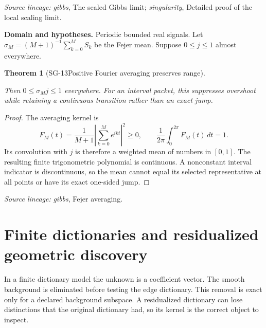 \documentclass[11pt]{article}
\newtheorem{theorem}{Theorem}[section]
\theoremstyle{definition}\newtheorem{definition}[theorem]{Definition}
\theoremstyle{remark}\newtheorem{remark}[theorem]{Remark}
\begin{document}
\par{\small\color{Teal}\textit{Source lineage:} \textit{gibbs}, The scaled Gibbs limit; \textit{singularity}, Detailed proof of the local scaling limit.}\par

\par{\small\textbf{Domain and hypotheses.} Periodic bounded real signals. Let $\sigma_M=(M+1)^{-1}\sum_{k=0}^MS_k$ be the Fejer mean. Suppose $0\le j\le1$ almost everywhere.}\par
\begin{theorem}[SG-13\quad Positive Fourier averaging preserves range]\label{SG-13}

Then $0\le\sigma_Mj\le1$ everywhere. For an interval packet, this suppresses
overshoot while retaining a continuous transition rather than an exact jump.

\end{theorem}
\begin{proof}

The averaging kernel is
\[
 F_M(t)=\frac1{M+1}\left|\sum_{k=0}^Me^{ikt}\right|^2\ge0,
 \qquad\frac1{2\pi}\int_0^{2\pi}F_M(t)\,dt=1.
\]
Its convolution with $j$ is therefore a weighted mean of numbers in $[0,1]$.
The resulting finite trigonometric polynomial is continuous. A nonconstant
interval indicator is discontinuous, so the mean cannot equal its selected
representative at all points or have its exact one-sided jump.

\end{proof}

\par{\small\color{Teal}\textit{Source lineage:} \textit{gibbs}, Fejer averaging.}\par

\section{Finite dictionaries and residualized geometric discovery}

In a finite dictionary model the unknown is a coefficient vector. The smooth
background is eliminated before testing the edge dictionary. This removal is
exact only for a declared background subspace. A residualized dictionary can
lose distinctions that the original dictionary had, so its kernel is the
correct object to inspect.
\end{document}
